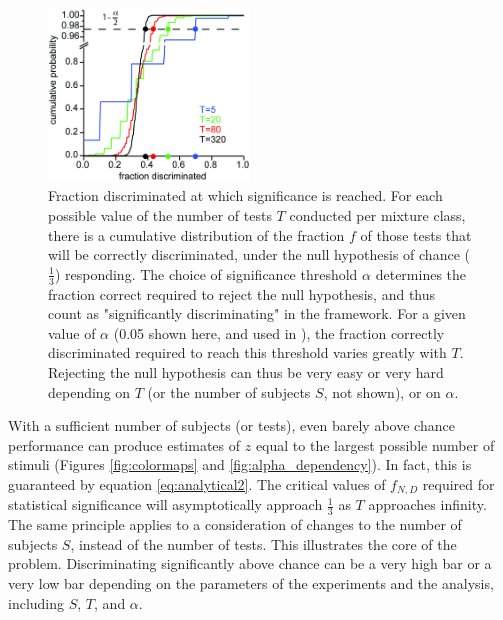 \documentclass[letterpaper,twocolumn,10pt]{article}
\begin{document}
\begin{figure}[!hbt]
    \centering
    \includegraphics[width=0.475\textwidth]{figures/Fig9_alpha_Crossing}
    \caption{
Fraction discriminated at which significance is reached. For each possible value of the number of tests $T$ conducted per mixture class, there is a cumulative distribution of the fraction $f$ of those tests that will be correctly discriminated, under the null hypothesis of chance ($\frac{1}{3}$) responding.  The choice of significance threshold $\alpha$ determines the fraction correct required to reject the null hypothesis, and thus count as "significantly discriminating" in the framework.  For a given value of $\alpha$ (0.05 shown here, and used in \cite{bushdid_humans_2014}), the fraction correctly discriminated required to reach this threshold varies greatly with $T$. Rejecting the null hypothesis can thus be very easy or very hard depending on $T$ (or the number of subjects $S$, not shown), or on $\alpha$.}
    \label{fig:alpha_crossing}
\end{figure} 

With a sufficient number of subjects (or tests), 
even barely above chance performance can produce estimates of $z$ equal to the largest possible number of stimuli (Figures \ref{fig:colormaps} and \ref{fig:alpha_dependency}).  
In fact, this is guaranteed by equation \ref{eq:analytical2}.  
The critical values of $f_{N,D}$ required for statistical significance will asymptotically approach $\frac{1}{3}$ 
as $T$ approaches infinity.  
The same principle applies to a consideration of changes to the number of subjects $S$, 
instead of the number of tests.  
This illustrates the core of the problem.  
Discriminating significantly above chance can be a very high bar or a very low bar 
depending on the parameters of the experiments and the analysis, including $S$, $T$, and $\alpha$.  

{\footnotesize 
}
\end{document}
